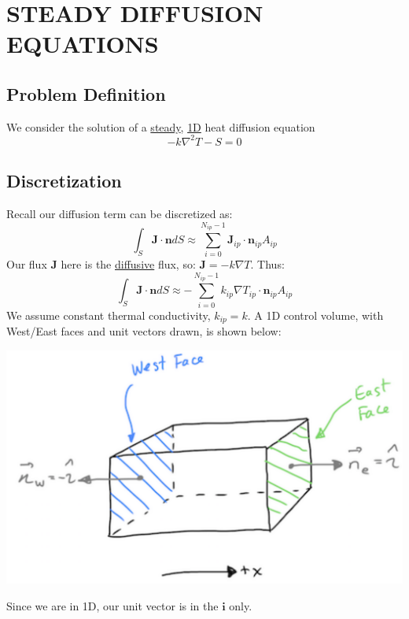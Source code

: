 \documentclass[11pt]{article}
\begin{document}
\section{STEADY DIFFUSION EQUATIONS}
\label{sec:org68bf4e2}
\subsection{Problem Definition}
\label{sec:org9f4608d}
We consider the solution of a \uline{steady}, \uline{1D} heat diffusion equation
\begin{equation}
-k \nabla^2 T - S = 0
\end{equation}
\subsection{Discretization}
\label{sec:orga12712e}
Recall our diffusion term can be discretized as:
\begin{equation}
\int_S \textbf{J} \cdot \textbf{n} dS \approx \sum_{i=0}^{N_{ip}-1} \textbf{J}_{ip}\cdot \textbf{n}_{ip}A_{ip}
\end{equation}
Our flux \(\textbf{J}\) here is the \uline{diffusive} flux, so: \(\textbf{J} = -k \nabla T\). Thus:
\begin{equation}
\int_S \textbf{J} \cdot \textbf{n} dS \approx -\sum_{i=0}^{N_{ip}-1} k_{ip} \nabla T_{ip}  \cdot \textbf{n}_{ip}A_{ip}
\end{equation}
We assume constant thermal conductivity, \(k_{ip} = k\). A 1D control volume, with West/East faces and unit vectors drawn, is shown below:
\begin{center}
\includegraphics[scale=0.2]{../pic/heat1D_CV.png}
\end{center}
Since we are in 1D, our unit vector is in the \(\textbf{i}\) only.\\
\end{document}
